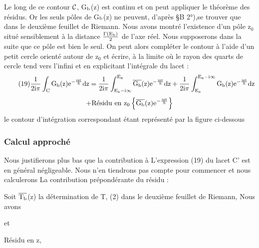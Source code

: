 Le long de ce contour $\mathcal{C}$, G$_{\text{b}}$(z) est continu et on peut appliquer
le théorème des résidus. Or les seuls pôles de G$_{\text{b}}$(z) ne peuvent, d'après
\S B 2°),se trouver que dans le deuxième feuillet de Riemann. Nous avons montré
l'existence d'un pôle z$_0$ situé sensiblement à la distance $\frac{\Gamma(\text{E}_{\text{b}})}{2}$ de l'axe réel.
Nous supposerons dans la suite que ce pôle est bien le seul. On peut alors compléter le contour  à l'aide d'un petit cercle orienté autour de z$_0$ et
écrire, à la limite où le rayon des quarts de cercle tend vers l'infini et
en explicitant l'intégrale du lacet :
\[
\tag{19} \frac{1}{2\text{i}\pi}\int_{\text{C}}\text{G}_{\text{b}}\text{(z)}\text{e}^{-\frac{\text{izt}}{\hbar}}\text{dz} =
\frac{1}{2\text{i}\pi}\int_{\text{E}_{\text{a}}-\text{i}\infty}^{\text{E}_{\text{a}}}\overline{\text{G}_{\text{b}}}\text{(z)}\text{e}^{-\frac{\text{izt}}{\hbar}}\text{dz} +
\frac{1}{2\text{i}\pi}\int_{\text{E}_{\text{a}}}^{\text{E}_{\text{a}}-\text{i}\infty}\text{G}_{\text{b}}\text{(z)}\text{e}^{-\frac{\text{izt}}{\hbar}}\text{dz}
\]
\[
+\text{Résidu en z}_0 \left \{ \overline{\text{G}_{\text{b}}}\text{(z)}\text{e}^{-\frac{\text{izt}}{\hbar}} \right \}
\]
le contour d'intégration correspondant étant représenté par la figure ci-dessous
\begin{center}  \end{center}
\subsubsection{Calcul approché} %

Nous justifierons plus bas que la contribution à L'expression (19) du lacet C' est en général négligeable. Nous n'en tiendrons pas
compte pour commencer et nous calculerons La contribution prépondérante du
résidu :

Soit $\overline{\text{T}_{\text{b}}}$(z) la détermination de T, (2) dans le deuxième feuillet
de Riemann, Nous avons


et

Résidu en z,

